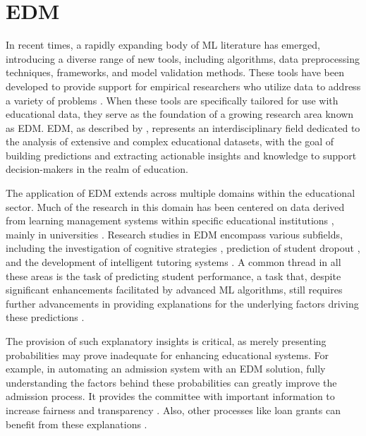 \section{EDM}

In recent times, a rapidly expanding body of ML literature has emerged, introducing a diverse range of new tools, including algorithms, data preprocessing techniques, frameworks, and model validation methods. These tools have been developed to provide support for empirical researchers who utilize data to address a variety of problems \cite{Athey2019MachineAbout}. When these tools are specifically tailored for use with educational data, they serve as the foundation of a growing research area known as EDM. EDM, as described by \cite{Romero2020EducationalSurvey}, represents an interdisciplinary field dedicated to the analysis of extensive and complex educational datasets, with the goal of building predictions and extracting actionable insights and knowledge to support decision-makers in the realm of education.

The application of EDM extends across multiple domains within the educational sector. Much of the research in this domain has been centered on data derived from learning management systems within specific educational institutions \cite{Fischer2020MiningChallenges}, mainly in universities \cite{Romero2020EducationalSurvey}. Research studies in EDM encompass various subfields, including the investigation of cognitive strategies \cite{Fancsali2018IntelligentOffs, Moussavi2016TheTopics}, prediction of student dropout \cite{Chaturapruek2018HowGPA, Jayaprakash2014EarlyInitiative}, and the development of intelligent tutoring systems \cite{Jiang2019Goal-basedRecommendation}. A common thread in all these areas is the task of predicting student performance, a task that, despite significant enhancements facilitated by advanced ML algorithms, still requires further advancements in providing explanations for the underlying factors driving these predictions \cite{Yang2021InterpretabilityLearning, Kovalev2020EducationalSolutions}.

The provision of such explanatory insights is critical, as merely presenting probabilities may prove inadequate for enhancing educational systems. For example, in automating an admission system with an EDM solution, fully understanding the factors behind these probabilities can greatly improve the admission process. It provides the committee with important information to increase fairness and transparency \cite{AlGhamdi2020APrediction, Maulana2023OptimizingPerspective}. Also, other processes like loan grants can benefit from these explanations \cite{Maulana2023OptimizingPerspective}.

